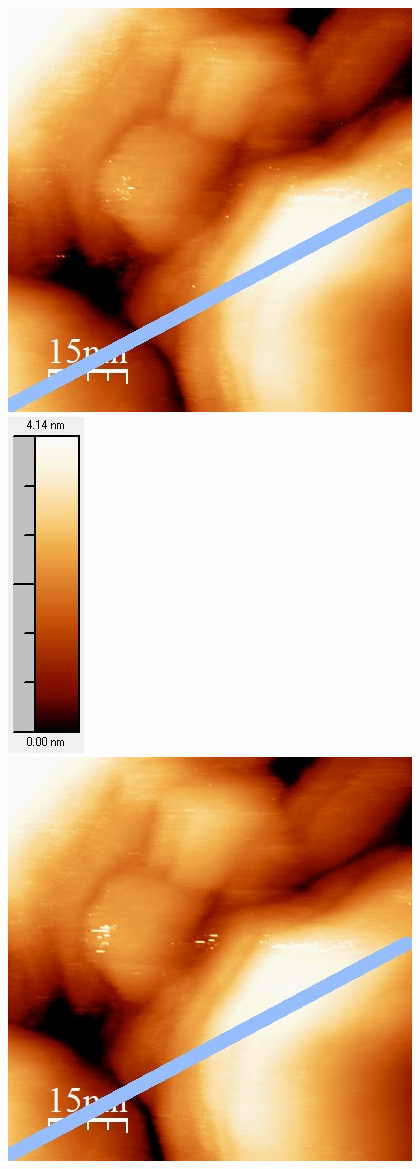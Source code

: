 \documentclass[12pt,a4paper]{article}
\begin{document}
\begin{figure}
\centering
\includegraphics[scale=0.6]{Bilder/Anhang/Zeit/0_6_Zeit_vor.jpg}
\includegraphics[scale=0.6]{Bilder/Anhang/Zeit/0_6_Zeit_vor_Skala.jpg}
\includegraphics[scale=0.6]{Bilder/Anhang/Zeit/0_6_Zeit_nach.jpg}

\end{figure}
\end{document}
